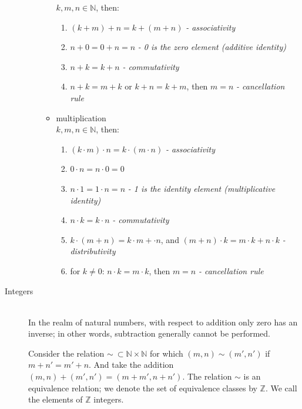 \documentclass[margin=0px]{article}
\newcommand{\N}{\mathbb{N}}
\newcommand{\Z}{\mathbb{Z}}
\begin{document}
\begin{description}
\begin{itemize}
\begin{itemize}
                            $k,m,n \in \N$, then:
                            \begin{enumerate}
                                \item $(k+m)+n = k+(m+n)$ \textit{- associativity}
                                \item $n+0 = 0+n = n$ \textit{- 0 is the zero element (additive identity)}
                                \item $n+k = k+n$ \textit{- commutativity}
                                \item $n+k = m+k$ or $k+n = k+m$, then $m=n$ \textit{- cancellation rule}
                            \end{enumerate}
                      \item multiplication \\
                            $k,m,n \in \N$, then:
                            \begin{enumerate}
                                \item $(k\cdot m)\cdot n = k\cdot (m\cdot n)$ \textit{- associativity}
                                \item $ 0\cdot n = n\cdot 0 = 0$
                                \item $n\cdot 1 = 1\cdot n = n$ \textit{- 1 is the identity element (multiplicative identity)}
                                \item $n\cdot k = k\cdot n$ \textit{- commutativity}
                                \item $k\cdot (m+n) = k\cdot m + \cdot n$, and $(m+n) \cdot k = m\cdot k+n\cdot k$ \textit{- distributivity}
                                \item for $k\neq 0$: $n\cdot k = m\cdot k$, then $m=n$ \textit{- cancellation rule}
                            \end{enumerate}
                  \end{itemize}
        \end{itemize}
    \item[Integers] \hfill \\
        In the realm of natural numbers, with respect to addition only zero has an inverse; in other words, subtraction generally cannot be performed.

        Consider the relation $\sim\ \subset\N\times\N$ for which $(m,n) \sim (m',n')$ if $m+n' = m'+n$. And take the addition $(m,n)+(m',n') = (m+m',n+n')$. The relation $\sim$ is an equivalence relation; we denote the set of equivalence classes by $\Z$. We call the elements of $\Z$ integers.


\end{description}
\end{document}
